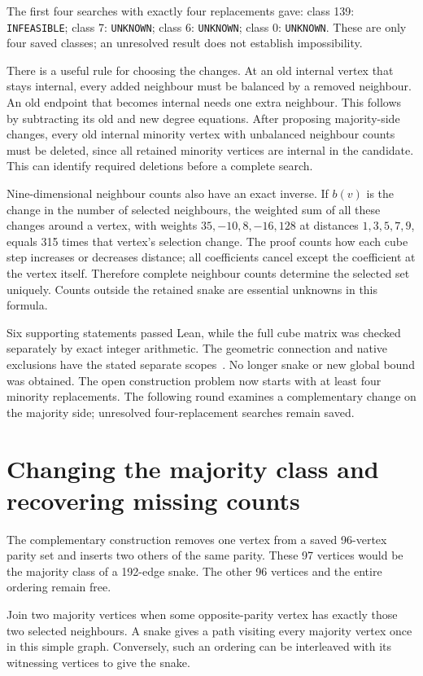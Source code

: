 \documentclass[11pt,a4paper]{article}
\begin{document}
The first four searches with exactly four replacements gave:
class 139: \texttt{INFEASIBLE}; class 7: \texttt{UNKNOWN}; class 6: \texttt{UNKNOWN}; class 0: \texttt{UNKNOWN}. These are only four saved classes; an unresolved result
does not establish impossibility.

There is a useful rule for choosing the changes. At an old internal
vertex that stays internal, every added neighbour must be balanced by
a removed neighbour. An old endpoint that becomes internal needs one
extra neighbour. This follows by subtracting its old and new degree
equations. After proposing majority-side changes, every old internal minority
vertex with unbalanced neighbour counts must be deleted, since all
retained minority vertices are internal in the candidate. This can identify required deletions before a complete search.

Nine-dimensional neighbour counts also have an exact inverse. If $b(v)$
is the change in the number of selected neighbours, the weighted sum of
all these changes around a vertex, with weights $35,-10,8,-16,128$ at
distances $1,3,5,7,9$, equals 315 times that vertex's selection change.
The proof counts how each cube step increases or decreases distance;
all coefficients cancel except the coefficient at the vertex itself.
Therefore complete neighbour counts determine the selected set uniquely.
Counts outside the retained snake are essential unknowns in this formula.

Six supporting statements passed Lean, while the full cube matrix was
checked separately by exact integer arithmetic. The geometric connection
and native exclusions have the stated separate scopes~\cite{research236}.
No longer snake or new global bound was obtained. The open construction
problem now starts with at least four minority replacements. The following round examines a complementary change on the majority
side; unresolved four-replacement searches remain saved.

\section{Changing the majority class and recovering missing counts}
The complementary construction removes one vertex from a saved
96-vertex parity set and inserts two others of the same parity. These
97 vertices would be the majority class of a 192-edge snake. The other
96 vertices and the entire ordering remain free.

Join two majority vertices when some opposite-parity vertex has exactly
those two selected neighbours. A snake gives a path visiting every
majority vertex once in this simple graph. Conversely, such an ordering
can be interleaved with its witnessing vertices to give the snake.
\end{document}
